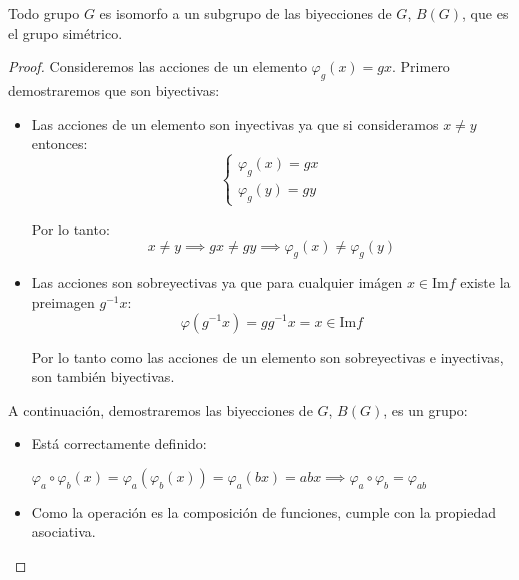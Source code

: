 \begin{thm}
    Todo grupo $G$ es isomorfo a un subgrupo de las biyecciones de $G$, $B(G)$, que es el grupo simétrico.
\end{thm}

\begin{proof}
    Consideremos las acciones de un elemento $\varphi_g(x) = gx$. Primero demostraremos que son biyectivas:
    
    \begin{itemize}
        \item Las acciones de un elemento son inyectivas ya que si consideramos $x \neq y$ entonces:
            \begin{equation}
                \begin{cases}
                    \varphi_g(x) = gx\\
                    \varphi_g(y) = gy
                \end{cases} 
            \end{equation}

            Por lo tanto:
            \begin{equation}
                x \neq y \implies gx \neq gy \implies \varphi_g(x) \neq \varphi_g(y)
            \end{equation}

        \item Las acciones son sobreyectivas ya que para cualquier imágen $x \in \text{Im}f$ existe la preimagen $g^{-1}x$:
            \begin{equation}
                \varphi(g^{-1}x) = gg^{-1}x = x \in \text{Im}f 
            \end{equation}

            Por lo tanto como las acciones de un elemento son sobreyectivas e inyectivas, son también biyectivas.
    \end{itemize}

    A continuación, demostraremos las biyecciones de $G$, $B(G)$, es un grupo:

    \begin{itemize}
        \item Está correctamente definido:

            $\varphi_a \circ \varphi_b(x) = \varphi_a(\varphi_b(x))=\varphi_a(bx) = abx \implies \varphi_a \circ \varphi_b = \varphi_{ab}$
        \item Como la operación es la composición de funciones, cumple con la propiedad asociativa.


\end{itemize}
\end{proof}
